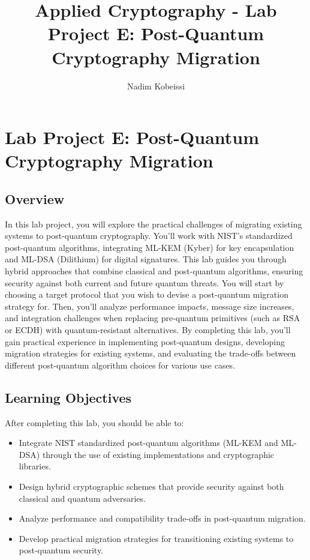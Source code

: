 \documentclass[10pt,a4paper,american]{article}
\title{Applied Cryptography - Lab Project E: Post-Quantum Cryptography Migration}
\author{Nadim Kobeissi}
\begin{document}
\classhandoutheader
\section*{Lab Project E: Post-Quantum Cryptography Migration}

\subsection*{Overview}
In this lab project, you will explore the practical challenges of migrating existing systems to post-quantum cryptography. You'll work with NIST's standardized post-quantum algorithms, integrating ML-KEM (Kyber) for key encapsulation and ML-DSA (Dilithium) for digital signatures. This lab guides you through hybrid approaches that combine classical and post-quantum algorithms, ensuring security against both current and future quantum threats. You will start by choosing a target protocol that you wish to devise a post-quantum migration strategy for. Then, you'll analyze performance impacts, message size increases, and integration challenges when replacing pre-quantum primitives (such as RSA or ECDH) with quantum-resistant alternatives. By completing this lab, you'll gain practical experience in implementing post-quantum designs, developing migration strategies for existing systems, and evaluating the trade-offs between different post-quantum algorithm choices for various use cases.

\subsection*{Learning Objectives}
After completing this lab, you should be able to:
\begin{itemize}
	\item Integrate NIST standardized post-quantum algorithms (ML-KEM and ML-DSA) through the use of existing implementations and cryptographic libraries.
	\item Design hybrid cryptographic schemes that provide security against both classical and quantum adversaries.
	\item Analyze performance and compatibility trade-offs in post-quantum migration.
	\item Develop practical migration strategies for transitioning existing systems to post-quantum security.
\end{itemize}
\end{document}
